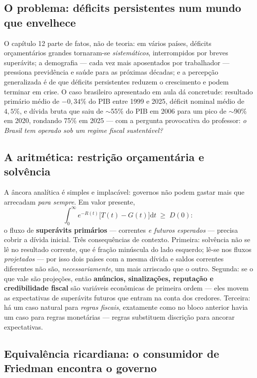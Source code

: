 \documentclass[12pt, a4paper]{article}
\newcommand{\dif}{\mathrm{d}}
\begin{document}
\subsection{O problema: déficits persistentes num mundo que envelhece}

O capítulo 12 parte de fatos, não de teoria: em vários países, déficits
orçamentários grandes tornaram-se \emph{sistemáticos}, interrompidos por
breves superávits; a demografia --- cada vez mais aposentados por trabalhador
--- pressiona previdência e saúde para as próximas décadas; e a percepção
generalizada é de que déficits persistentes reduzem o crescimento e podem
terminar em crise. O caso brasileiro apresentado em aula dá concretude:
resultado primário médio de $-0{,}34\%$ do PIB entre 1999 e 2025, déficit
nominal médio de $4{,}5\%$, e dívida bruta que saiu de $\sim$55\% do PIB em
2006 para um pico de $\sim$90\% em 2020, rondando 75\% em 2025 --- com a
pergunta provocativa do professor: \emph{o Brasil tem operado sob um regime
fiscal sustentável?}

\subsection{A aritmética: restrição orçamentária e solvência}

A âncora analítica é simples e implacável: governos não podem gastar mais que
arrecadam \emph{para sempre}. Em valor presente,
\[
\int_{0}^{\infty} e^{-R(t)}\bigl[T(t) - G(t)\bigr]\dif t \;\geq\; D(0):
\]
o fluxo de \textbf{superávits primários} --- correntes \emph{e futuros
esperados} --- precisa cobrir a dívida inicial. Três consequências de
contexto. Primeira: solvência não se lê no resultado corrente, que é fração
minúscula do lado esquerdo; lê-se nos fluxos \emph{projetados} --- por isso
dois países com a mesma dívida e saldos correntes diferentes não são,
\emph{necessariamente}, um mais arriscado que o outro. Segunda: se o que vale
são projeções, então \textbf{anúncios, sinalizações, reputação e
credibilidade fiscal} são variáveis econômicas de primeira ordem --- eles
movem as expectativas de superávits futuros que entram na conta dos credores.
Terceira: há um caso natural para \emph{regras fiscais}, exatamente como no
bloco anterior havia um caso para regras monetárias --- regras substituem
discrição para ancorar expectativas.

\subsection{Equivalência ricardiana: o consumidor de Friedman encontra o governo}
\end{document}
